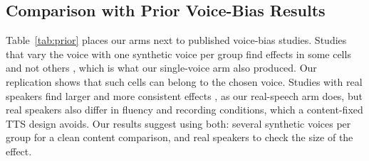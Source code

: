 \subsection{Comparison with Prior Voice-Bias Results}
\label{sec:prior}

Table~\ref{tab:prior} places our arms next to published voice-bias studies. Studies that vary the voice with one synthetic voice per group find effects in some cells and not others \citep{satish2026thevoicebehi,wei2026biasintheear}, which is what our single-voice arm also produced. Our replication shows that such cells can belong to the chosen voice. Studies with real speakers find larger and more consistent effects \citep{koenecke2020racial,lin2026vibevoiceind}, as our real-speech arm does, but real speakers also differ in fluency and recording conditions, which a content-fixed TTS design avoids. Our results suggest using both: several synthetic voices per group for a clean content comparison, and real speakers to check the size of the effect.

